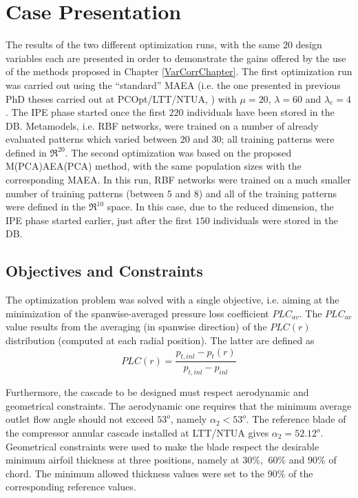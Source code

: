 \section{Case Presentation}

The results of the two different optimization runs, with the same $20$ design variables each are presented in order to demonstrate the gains offered by the use of the methods proposed in Chapter \ref{VarCorrChapter}.  
The first optimization run was carried out using the ``standard'' MAEA (i.e. the one presented in previous PhD theses carried out at PCOpt/LTT/NTUA, \cite{phd_Karakasis,phd_Kampolis}) with $\mu\!=\!20$, $\lambda\!=\!60$ and $\lambda_e\!=\!4$. The IPE phase started once the first $220$ individuals have been stored in the DB. Metamodels, i.e. RBF networks, were trained on a number of already evaluated patterns which varied between $20$ and $30$; all training patterns were defined in $\Re^{20}$. The second optimization was based on the proposed M(PCA)AEA(PCA) method, with the same population sizes with the corresponding MAEA. In this run, RBF networks were trained on a much smaller number of training patterns (between $5$ and $8$) and all of the training patterns were defined in the $\Re^{10}$ space. In this case, due to the reduced dimension, the IPE phase started earlier, just after the first $150$ individuals were stored in the DB.     

   
\subsection{Objectives and Constraints}
The optimization problem was solved with a single objective, i.e. aiming at the minimization of the spanwise-averaged pressure loss coefficient
$PLC_{av}$. The $PLC_{av}$ value results from the averaging (in spanwise direction) of the $PLC(r)$ distribution (computed at each radial position). The latter are defined as     
\begin{equation}
PLC(r)=\frac{p_{t,inl}-p_t(r)}{p_{t,inl}-p_{inl}}
\label{res:ntua_blade:plc}
\end{equation}

Furthermore, the cascade to be designed must respect aerodynamic and geometrical constraints. The aerodynamic one requires that the minimum average outlet flow angle should not exceed $53^o$, namely $\alpha_2<53^o$. The reference blade of the compressor annular cascade installed at LTT/NTUA gives $\alpha_2=52.12^o$. Geometrical constraints were used to make the blade respect the desirable minimum airfoil thickness at three positions, namely at $30\%$, $~60\%$ and $90\%$ of chord. The minimum allowed thickness values were set to the $90\%$ of the corresponding reference values.      


